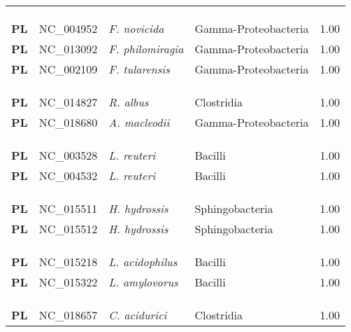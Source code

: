 \begin{adjustwidth}{-3cm}{2cm}
{\begin{supertabular}{>{\bfseries}l|p{0.1\textwidth}p{0.14\textwidth}l|l}
\\
\\
\hline\\
PL & NC\_004952 & \textit{F. novicida} & Gamma-Proteobacteria & 1.00\\
PL & NC\_013092 & \textit{F. philomiragia} & Gamma-Proteobacteria & 1.00\\
PL & NC\_002109 & \textit{F. tularensis} & Gamma-Proteobacteria & 1.00\\
\\
\\
\hline\\
PL & NC\_014827 & \textit{R. albus} & Clostridia & 1.00\\
PL & NC\_018680 & \textit{A. macleodii} & Gamma-Proteobacteria & 1.00\\
\\
\\
\hline\\
PL & NC\_003528 & \textit{L. reuteri} & Bacilli & 1.00\\
PL & NC\_004532 & \textit{L. reuteri} & Bacilli & 1.00\\
\\
\\
\hline\\
PL & NC\_015511 &  \textit{H. hydrossis} & Sphingobacteria & 1.00\\
PL & NC\_015512 &  \textit{H. hydrossis} & Sphingobacteria & 1.00\\
\\
\\
\hline\\
PL & NC\_015218 & \textit{L. acidophilus} & Bacilli & 1.00\\
PL & NC\_015322 & \textit{L. amylovorus} & Bacilli & 1.00\\
\\
\\
\hline\\
PL & NC\_018657 & \textit{C. acidurici} & Clostridia & 1.00\\

\end{supertabular}}
\end{adjustwidth}
